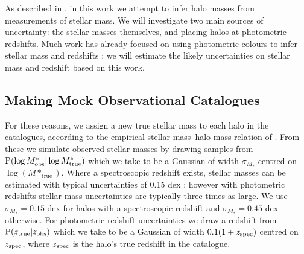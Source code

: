 \documentclass[useAMS,usenatbib,a4paper]{mn2e}
\begin{document}

As described in , in this work we attempt to  infer halo
masses from measurements of stellar mass. We will investigate two main sources
of uncertainty: the stellar masses themselves, and placing halos at
photometric redshifts. Much work has already focused on using photometric
colours to infer stellar mass \citep[\eg][]{AugerEtal2009} and redshifts
\citep[\eg][]{BPZ}: we will estimate the likely uncertainties on stellar mass
and redshift based on this work.  



\subsection{Making Mock Observational Catalogues}

 For these reasons, we assign a new true stellar
mass to each halo in the \MS catalogues, according to the empirical stellar
mass--halo mass relation of \citet{BehrooziEtal2010}. From these we simulate
observed stellar masses by drawing samples from  ${\rm P}(\log{M^{*}_{\rm
obs}}|\log{M^{*}_{\rm true}})$ which we take to be a Gaussian of width
$\sigma_{M_*}$ centred on $\log(M*_{\mathrm {true}})$. Where a spectroscopic
redshift exists, stellar masses can be estimated with typical uncertainties of
0.15 dex \citep{AugerEtal2009}; however with photometric redshifts stellar
mass uncertainties are typically three times as large. We use
$\sigma_{M_*}=0.15$ dex for halos with a spectroscopic redshift and
$\sigma_{M_*}=0.45$ dex otherwise. For photometric redshift uncertainties we
draw a redshift from ${\rm P}(z_{\rm true}|z_{\rm obs})$ which we take to be a
Gaussian of width $0.1(1+z_{\rm spec})$ centred on $z_{\rm spec}$, where
$z_{\rm spec}$ is the halo's true redshift in the \MS catalogue.
\end{document}
